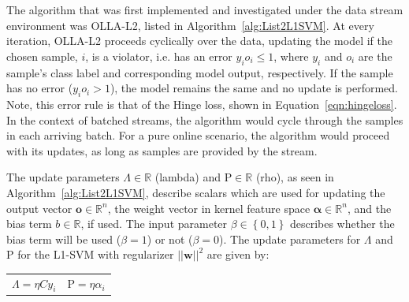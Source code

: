 \documentclass[reqno]{vcuthesis}
\newcommand{\set}[1]{{\left\{#1\right\}}}
\newcommand{\reals}{{\mathbb{R}}}
\newcommand{\Rho}{\mathrm{P}}
\numberwithin{equation}{chapter}
\begin{document}
The algorithm that was first implemented and investigated under the data stream environment was OLLA-L2, listed in Algorithm~\ref{alg:List2L1SVM}. At every iteration, OLLA-L2 proceeds cyclically over the data, updating the model if the chosen sample, $i$, is a violator, i.e. has an error $y_i o_i \leq 1$, where $y_i$ and $o_i$ are the sample's class label and corresponding model output, respectively. If the sample has no error ($y_i o_i > 1$), the model remains the same and no update is performed. Note, this error rule is that of the Hinge loss, shown in Equation~\ref{eqn:hingeloss}. In the context of batched streams, the algorithm would cycle through the samples in each arriving batch. For a pure online scenario, the algorithm would proceed with its updates, as long as samples are provided by the stream. 

The update parameters $\Lambda \in \reals$ (lambda) and $\Rho \in \reals$ (rho), as seen in Algorithm~\ref{alg:List2L1SVM}, describe scalars which are used for updating the output vector $\bm o \in \reals^n$, the weight vector in kernel feature space $\bm \alpha \in \reals^n$, and the bias term $b \in \reals$, if used. The input parameter $\beta \in \set{0,1}$ describes whether the bias term will be used ($\beta = 1$) or not ($\beta = 0$). The update parameters for $\Lambda$ and $\Rho$ for the L1-SVM with regularizer $||\bm w||^2$ are given by:
\begin{table}[H]
\centering \small
\begin{tabular}{cc}
$\Lambda = \eta C y_i$ & $\Rho = \eta \alpha_i$
\end{tabular}
\end{table}
\end{document}
